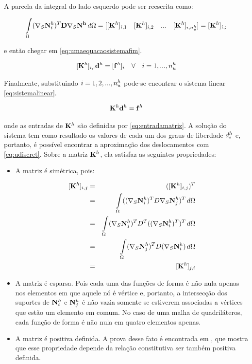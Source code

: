 A parcela da integral do lado esquerdo pode ser reescrita como:

\begin{equation}
\omeint{(\sopnabla \basefunctionfine)^T \mathbf{D} \sopnabla \mathbf{N^h} }= [ [\rigidmatrix]_{i,1}\quad   [\rigidmatrix]_{i,2} \quad ... \quad  [\rigidmatrix]_{i,\qtdfreedomfine}] =  [\rigidmatrix]_{i,:}
\end{equation}

e então chegar em \eqref{eq:umaequacaosistemafim}.

\begin{equation} \label{eq:umaequacaosistemafim}
[\rigidmatrix]_{i,:} \mathbf{d}^h = [\mathbf{f}^h]_i \quad \forall \quad i=1,..., \qtdfreedomfine
\end{equation}

Finalmente, substituindo  $i = 1, 2, ..., \qtdfreedomfine$ pode-se encontrar o sistema linear \eqref{eq:sistemalinear}.

\begin{equation}\label{eq:sistemalinear}
    \rigidmatrix \mathbf{d}^h = \mathbf{f}^h
\end{equation}



onde as entradas de $\rigidmatrix $ são definidas por \eqref{eq:entradamatriz}. A solução do sistema tem como resultado os valores de cada um dos graus de liberdade $\freedomfine$ e, portanto, é possível encontrar a aproximação dos deslocamentos com \eqref{eq:udiscret}. Sobre a matriz $\rigidmatrix$, ela satisfaz as seguintes propriedades:


\begin{itemize}
    \item A matriz é simétrica, pois:

    \begin{eqnarray}
    \rigidmatrixentry & = & (\rigidmatrixentry)^T \\
            & = & \omeint{((\sopnabla \basefunctionfine)^T D \sopnabla \basefunctionfine[j])^T} \\
            & = & \omeint{ ( \sopnabla \basefunctionfine[j])^T D^T  ((\sopnabla \basefunctionfine)^T)^T}\\
            & = & \omeint{ ( \sopnabla \basefunctionfine[j])^T D  (\sopnabla \basefunctionfine)} \\
            & = & [\rigidmatrix]_{j,i}
    \end{eqnarray}


    \item A matriz é esparsa. Pois cada uma das funções de forma é não nula apenas nos elementos em que aquele nó é vértice e, portanto, a intersecção dos suportes de $\basefunctionfine$ e $\basefunctionfine[j]$ é não vazia somente se estiverem associadas a vértices que estão um elemento em comum. No caso de uma malha de quadriláteros, cada função de forma é não nula em quatro elementos apenas.

    \item A matriz é positiva definida. A prova desse fato é encontrada em \cite{hughes}, que mostra que esse propriedade depende da relação constitutiva ser também positiva definida.
\end{itemize}



